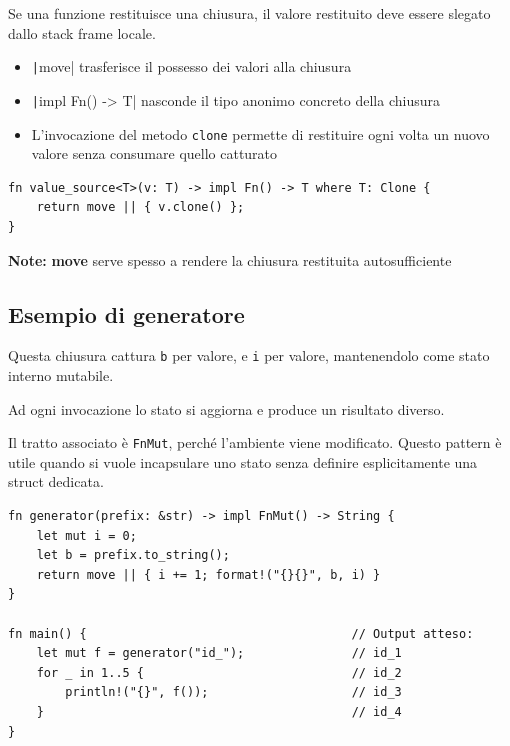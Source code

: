 
Se una funzione restituisce una chiusura, il valore restituito deve essere
slegato dallo stack frame locale.

\begin{itemize}
  \item \texttt|move| trasferisce il possesso dei valori alla chiusura
  \item \texttt|impl Fn() -> T| nasconde il tipo anonimo concreto
        della chiusura
  \item L'invocazione del metodo \verb|clone| permette di restituire ogni volta
        un nuovo valore senza consumare quello catturato
\end{itemize}


\begin{verbatim}
fn value_source<T>(v: T) -> impl Fn() -> T where T: Clone { 
    return move || { v.clone() }; 
} 
\end{verbatim}

\begin{tcolorbox}
  \textbf{Note:} \textbf{move} serve spesso a rendere la chiusura restituita autosufficiente
\end{tcolorbox}


\subsection{Esempio di generatore}

Questa chiusura cattura \verb|b| per valore, e \verb|i|  per valore, mantenendolo
come stato interno mutabile.

Ad ogni invocazione lo stato si aggiorna e produce un risultato diverso.

Il tratto associato è \verb|FnMut|, perché l'ambiente viene modificato.
Questo pattern è utile quando si vuole incapsulare uno stato senza definire esplicitamente
una struct dedicata.

\begin{verbatim}
fn generator(prefix: &str) -> impl FnMut() -> String { 
    let mut i = 0; 
    let b = prefix.to_string(); 
    return move || { i += 1; format!("{}{}", b, i) } 
} 

fn main() {                                     // Output atteso:
    let mut f = generator("id_");               // id_1
    for _ in 1..5 {                             // id_2
        println!("{}", f());                    // id_3
    }                                           // id_4
} 
\end{verbatim}
